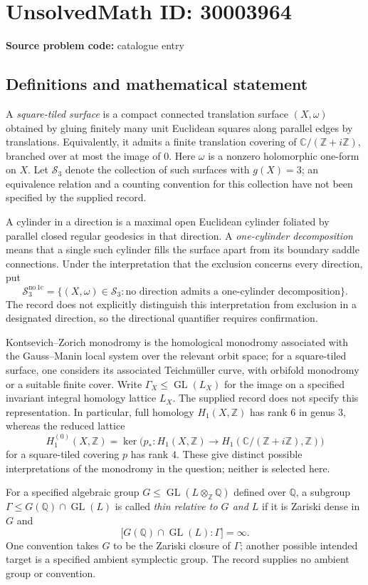 \documentclass[11pt]{article}
\newcommand{\Z}{\mathbb{Z}}
\newcommand{\Q}{\mathbb{Q}}
\newcommand{\C}{\mathbb{C}}
\begin{document}
\section*{UnsolvedMath ID: 30003964}
\textbf{Source problem code:} catalogue entry
\subsection{Definitions and mathematical statement}
A \emph{square-tiled surface} is a compact connected translation surface \((X,\omega)\) obtained by gluing finitely many unit Euclidean squares along parallel edges by translations. Equivalently, it admits a finite translation covering of \(\C/(\Z+i\Z)\), branched over at most the image of \(0\). Here \(\omega\) is a nonzero holomorphic one-form on \(X\). Let \(\mathcal S_3\) denote the collection of such surfaces with \(g(X)=3\); an equivalence relation and a counting convention for this collection have not been specified by the supplied record.

A cylinder in a direction is a maximal open Euclidean cylinder foliated by parallel closed regular geodesics in that direction. A \emph{one-cylinder decomposition} means that a single such cylinder fills the surface apart from its boundary saddle connections. Under the interpretation that the exclusion concerns every direction, put
\[
\mathcal S_3^{\mathrm{no\,1c}}
=\{(X,\omega)\in\mathcal S_3:\text{no direction admits a one-cylinder decomposition}\}.
\]
The record does not explicitly distinguish this interpretation from exclusion in a designated direction, so the directional quantifier requires confirmation.

Kontsevich--Zorich monodromy is the homological monodromy associated with the Gauss--Manin local system over the relevant orbit space; for a square-tiled surface, one considers its associated Teichm\"uller curve, with orbifold monodromy or a suitable finite cover. Write \(\Gamma_X\leq\operatorname{GL}(L_X)\) for the image on a specified invariant integral homology lattice \(L_X\). The supplied record does not specify this representation. In particular, full homology \(H_1(X,\Z)\) has rank \(6\) in genus \(3\), whereas the reduced lattice
\[
H_1^{(0)}(X,\Z)
=\ker\bigl(p_*:H_1(X,\Z)\longrightarrow H_1(\C/(\Z+i\Z),\Z)\bigr)
\]
for a square-tiled covering \(p\) has rank \(4\). These give distinct possible interpretations of the monodromy in the question; neither is selected here.

For a specified algebraic group \(G\leq\operatorname{GL}(L\otimes_{\Z}\Q)\) defined over \(\Q\), a subgroup \(\Gamma\leq G(\Q)\cap\operatorname{GL}(L)\) is called \emph{thin relative to \(G\) and \(L\)} if it is Zariski dense in \(G\) and
\[
\bigl[G(\Q)\cap\operatorname{GL}(L):\Gamma\bigr]=\infty.
\]
One convention takes \(G\) to be the Zariski closure of \(\Gamma\); another possible intended target is a specified ambient symplectic group. The record supplies no ambient group or convention.
\end{document}

